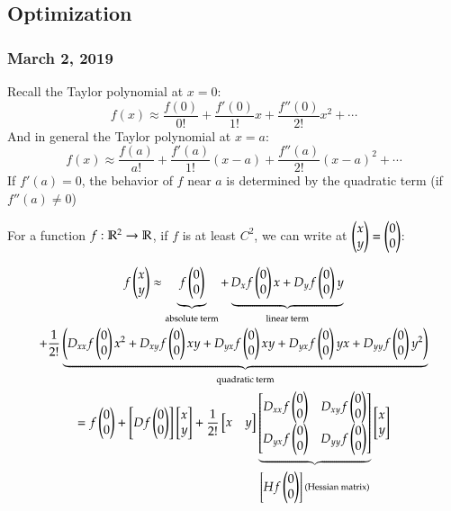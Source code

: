\subsection{Optimization}
\subsubsection*{March 2, 2019}

Recall the Taylor polynomial at $x=0$: 
\[f(x)\approx \frac{f(0)}{0!} + \frac{f'(0)}{1!}x + \frac{f''(0)}{2!}x^2+\cdots\]
And in general the Taylor polynomial at $x=a$: 
\[f(x)\approx \frac{f(a)}{a!} + \frac{f'(a)}{1!}(x-a) + \frac{f''(a)}{2!}(x-a)^2+\cdots\]
If $f'(a)=0$, the behavior of $f$ near $a$ is determined by the quadratic term (if $f''(a)\neq 0$)

For a function $f : \mathbb{R}^2 \to \mathbb{R}$, if $f$ is at least $C^2$, we can write at $\begin{pmatrix} x \\ y \end{pmatrix} = \begin{pmatrix} 0 \\ 0 \end{pmatrix}$: 

\begin{multline}
	f\begin{pmatrix} x \\ y \end{pmatrix} \approx \underbrace{f\begin{pmatrix} 0 \\ 0 \end{pmatrix}}_{\text{absolute term}} + \underbrace{D_xf\begin{pmatrix} 0 \\ 0 \end{pmatrix}x + D_yf\begin{pmatrix} 0 \\ 0 \end{pmatrix}y}_{\text{linear term}} \\ 
	+ \frac{1}{2!}\underbrace{\left(D_{xx}f\begin{pmatrix} 0 \\ 0 \end{pmatrix}x^2 + D_{xy}f\begin{pmatrix} 0 \\ 0 \end{pmatrix}xy + D_{yx}f\begin{pmatrix} 0 \\ 0 \end{pmatrix} xy + D_{yx}f\begin{pmatrix} 0 \\ 0 \end{pmatrix}yx + D_{yy}f\begin{pmatrix} 0 \\ 0 \end{pmatrix}y^2\right)}_{\text{quadratic term}} \\
	=f\begin{pmatrix} 0 \\ 0 \end{pmatrix} + \begin{bmatrix} Df\begin{pmatrix} 0 \\ 0 \end{pmatrix} \end{bmatrix}\begin{bmatrix} x \\ y \end{bmatrix} + \frac{1}{2!}\begin{bmatrix} x & y \end{bmatrix}\underbrace{\begin{bmatrix} D_{xx}f\begin{pmatrix} 0 \\ 0 \end{pmatrix} & D_{xy}f\begin{pmatrix} 0 \\ 0 \end{pmatrix} \\ D_{yx}f\begin{pmatrix} 0 \\ 0 \end{pmatrix} & D_{yy}f\begin{pmatrix} 0 \\ 0 \end{pmatrix} \end{bmatrix}}_{\begin{bmatrix} Hf\begin{pmatrix} 0 \\ 0 \end{pmatrix} \end{bmatrix}\text{ (Hessian matrix)}}\begin{bmatrix} x \\ y \end{bmatrix}
\end{multline}

